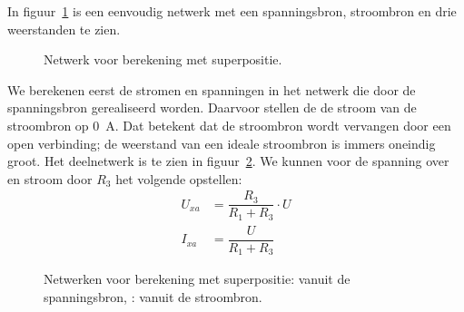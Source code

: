 In figuur~\ref{fig:gelnetwerkvoorsuperpositiebeginsel} is een eenvoudig
netwerk met een spanningsbron, stroombron en drie weerstanden te zien.

\begin{figure}[!ht]
\centering
{}
\caption{Netwerk voor berekening met superpositie.}
\label{fig:gelnetwerkvoorsuperpositiebeginsel}
\end{figure}

We berekenen eerst de stromen en spanningen in het netwerk die door de
spanningsbron gerealiseerd worden. Daarvoor stellen de de stroom van de
stroombron op \SI{0}{\ampere}. Dat betekent dat de stroombron wordt vervangen door
een open verbinding; de weerstand van een ideale stroombron is immers
oneindig groot. Het deelnetwerk is te zien in
figuur~\ref{fig:gelnetwerkvoorsuperpositiebeginselsplita}. We kunnen
voor de spanning over en stroom door $R_3$ het volgende opstellen:
%
\begin{equation}
\begin{split}
U_{xa} &= \dfrac{R_3}{R_1+R_3}\cdot U \\
I_{xa} &= \dfrac{U}{R_1+R_3}
\end{split}
\end{equation}

\begin{figure}[!ht]
\centering
\begin{subfigure}{0.48\textwidth}
\centering
{}
\caption{}
\label{fig:gelnetwerkvoorsuperpositiebeginselsplita}
\end{subfigure}\hfill%
\begin{subfigure}{0.48\textwidth}
\centering
{}
\caption{}
\label{fig:gelnetwerkvoorsuperpositiebeginselsplitb}
\end{subfigure}
\captionsetup{width=0.8\textwidth}
\caption{Netwerken voor berekening met superpositie:  vanuit de spanningsbron, : vanuit de stroombron.}
\end{figure}

